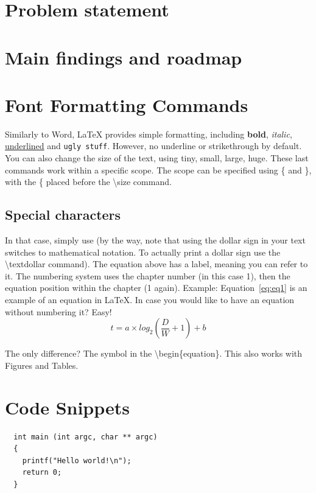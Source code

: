 \section{Problem statement}

\section{Main findings and roadmap}


\section{Font Formatting Commands}
Similarly to Word, LaTeX provides simple formatting, including \textbf{bold}, \textit{italic}, \underline{underlined} and \texttt{ugly stuff}.
However, no underline or strikethrough by default.
You can also change the size of the text, using {\tiny tiny}, {\small small}, {\large large}, {\huge huge}.
These last commands work within a specific scope.
The scope can be specified using \{ and \}, with the \{ placed before the \textbackslash{}size command.

\subsection{Special characters}
In that case, simply use \textdollar{} (by the way, note that using the dollar sign in your text switches to mathematical notation. To actually print a dollar sign use the \textbackslash{}textdollar command).
The equation above has a label, meaning you can refer to it. The numbering system uses the chapter number (in this case 1), then the equation position within the chapter (1 again).
Example: Equation~\ref{eq:eq1} is an example of an equation in LaTeX{}.
In case you would like to have an equation without numbering it? Easy!
\begin{equation*}
t = a \times log_{2}(\frac{D}{W} + 1) + b
\end{equation*}

The only difference? The \textasteriskcentered{}  symbol in the \textbackslash{}begin\{equation\textbf{\textasteriskcentered}\}.
This also works with Figures and Tables.

\section{Code Snippets}

\begin{lstlisting}
  int main (int argc, char ** argc)
  {
    printf("Hello world!\n");
    return 0;
  }
\end{lstlisting}

